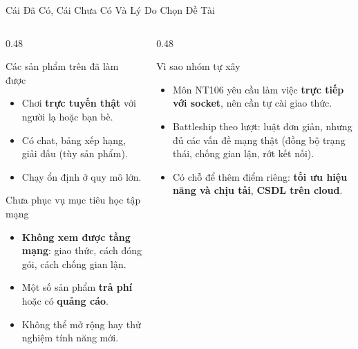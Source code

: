 \begin{frame}{Cái Đã Có, Cái Chưa Có Và Lý Do Chọn Đề Tài}
  \begin{columns}[T]
    \begin{column}{0.48\textwidth}
      \begin{block}{Các sản phẩm trên đã làm được}
        \begin{itemize}
          \item Chơi \textbf{trực tuyến thật} với người lạ hoặc bạn bè.
          \item Có chat, bảng xếp hạng, giải đấu (tùy sản phẩm).
          \item Chạy ổn định ở quy mô lớn.
        \end{itemize}
      \end{block}
      \begin{alertblock}{Chưa phục vụ mục tiêu học tập mạng}
        \begin{itemize}
          \item \textbf{Không xem được tầng mạng}: giao thức, cách đóng gói, cách chống gian lận.
          \item Một số sản phẩm \textbf{trả phí} hoặc có \textbf{quảng cáo}.
          \item Không thể mở rộng hay thử nghiệm tính năng mới.
        \end{itemize}
      \end{alertblock}
    \end{column}
    \begin{column}{0.48\textwidth}
      \begin{exampleblock}{Vì sao nhóm tự xây}
        \begin{itemize}
          \item Môn NT106 yêu cầu làm việc \textbf{trực tiếp với socket}, nên cần tự cài giao thức.
          \item Battleship theo lượt: luật đơn giản, nhưng đủ các vấn đề mạng thật (đồng bộ trạng thái, chống gian lận, rớt kết nối).
          \item Có chỗ để thêm điểm riêng: \textbf{tối ưu hiệu năng và chịu tải}, \textbf{CSDL trên cloud}.
        \end{itemize}
      \end{exampleblock}
    \end{column}
  \end{columns}
\end{frame}

